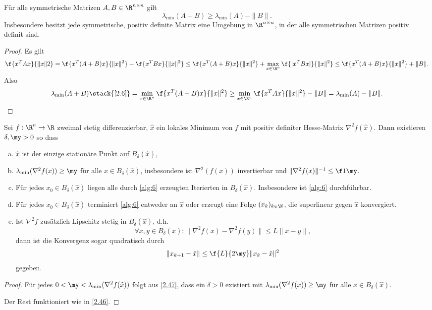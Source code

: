 \begin{lem} \label{2.47}
	Für alle symmetrische Matrizen $A, B \in \R^{n\times n}$ gilt
	\[
		\lambda_{\text{min}}(A + B) \ge \lambda_{\text{min}}(A) - \|B\|.
	\]
	Insbesondere besitzt jede symmetrische, positiv definite Matrix eine Umgebung in $\R^{n\times n}$, in der alle symmetrischen Matrizen positiv definit sind.
	\begin{proof}
		Es gilt
		\[
			\f {x^T A x}{\|x\|2}
			= \f {x^T (A+B) x}{\|x\|^2} - \f {x^T B x}{\|x\|^2}
			\le \f {x^T (A+B) x}{\|x\|^2} + \max_{x\in\R^n} \f {|x^T B x|}{\|x\|^2}
			\le \f {x^T (A+B) x}{\|x\|^2} + \|B\|.
		\]
		Also
		\[
			\lambda_{\text{min}}(A+B)
			\stack{\ref{2.6}}= \min_{x\in \R^n} \f {x^T(A+B)x}{\|x\|^2}
			\ge \min_{x\in\R^n} \f {x^T A x}{\|x\|^2} - \|B\|
			= \lambda_{\text{min}}(A) - \|B\|.
		\]
	\end{proof}
\end{lem}

\begin{st} \label{2.48}
	Sei $f: \R^n \to \R$ zweimal stetig differenzierbar, $\hat x$ ein lokales Minimum von $f$ mit positiv definiter Hesse-Matrix $\nabla^2 f(\hat x)$.
	Dann existieren $\delta, \my > 0$ so dass
	\begin{enumerate}[(a)]
		\item
			$\hat x$ ist der einzige stationäre Punkt auf $B_\delta(\hat x)$,
		\item
			$\lambda_{\text{min}}(\nabla^2 f(x)) \ge \my$ für alle $x \in B_\delta(\hat x)$, insbesondere ist $\nabla^2(f(x))$ invertierbar und $\|\nabla^2 f(x)\|^{-1} \le \f 1\my$.
		\item
			Für jedes $x_0 \in B_\delta(\hat x)$ liegen alle durch \ref{alg:6} erzeugten Iterierten in $B_\delta(\hat x)$.
			Insbesondere ist \ref{alg:6} durchführbar.
		\item
			Für jedes $x_0 \in B_\delta(\hat x)$ terminiert \ref{alg:6} entweder an $\hat x$ oder erzeugt eine Folge $(x_k)_{k\in\N}$, die superlinear gegen $\hat x$ konvergiert.
		\item
			Ist $\nabla^2 f$ zusätzlich Lipschitz-stetig in $B_\delta(\hat x)$, d.h.
			\[
				\forall x,y \in B_\delta(\hat x) : \| \nabla^2 f(x) - \nabla^2 f(y) \|
				\le L \|x-y\|,
			\]
			dann ist die Konvergenz sogar quadratisch durch
			\[
				\|x_{k+1} - \hat x\| \le \f {L}{2\my} \|x_k - \hat x\|^2
			\]
			gegeben.
	\end{enumerate}
	\begin{proof}
		Für jedes $0 < \my < \lambda_{\text{min}}(\nabla^2 f(\hat x))$ folgt aus \ref{2.47}, dass ein $\delta > 0$ existiert mit $\lambda_{\text{min}}(\nabla^2 f(x)) \ge \my$ für alle $x \in B_\delta(\hat x)$.

		Der Rest funktioniert wie in \ref{2.46}.
	\end{proof}
\end{st}

